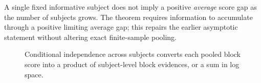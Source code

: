 \begin{remark}
A single fixed informative subject does not imply a positive \emph{average} score gap as the number
of subjects grows. The theorem requires information to accumulate through a positive limiting
average gap; this repairs the earlier asymptotic statement without altering exact finite-sample
pooling.
\end{remark}

\begin{figure}[H]
\centering
\resizebox{0.96\textwidth}{!}{}
\caption{Conditional independence across subjects converts each pooled block score into a product of subject-level block evidences, or a sum in log space.}
\label{fig:shared-plate}
\end{figure}
